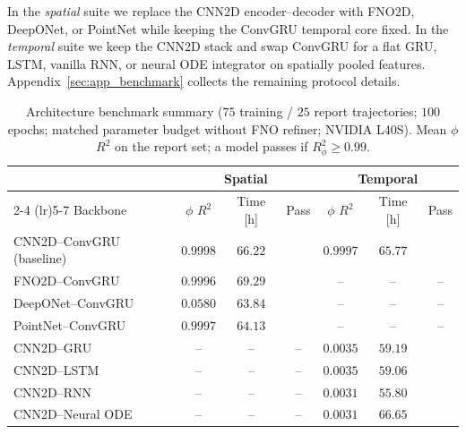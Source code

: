 \documentclass[10pt]{article}
\newcommand{\benchpass}{\textcolor{green!50!black}{\checkmark}}
\newcommand{\benchfail}{\textcolor{red}{\textbf{\texttimes}}}
\theoremstyle{definition}
\begin{document}
In the \emph{spatial} suite we replace the CNN2D encoder--decoder with FNO2D, DeepONet, or PointNet while keeping the ConvGRU temporal core fixed.
%
In the \emph{temporal} suite we keep the CNN2D stack and swap ConvGRU for a flat GRU, LSTM, vanilla RNN, or neural ODE integrator on spatially pooled features.
%
Appendix~\ref{sec:app_benchmark} collects the remaining protocol details.


\begin{table}[htbp]
\centering
\caption{Architecture benchmark summary ($75$ training / $25$ report trajectories; $100$ epochs; matched parameter budget without FNO refiner; NVIDIA L40S).
Mean $\phi$ $R^2$ on the report set; a model passes if $R^2_{\phi}\ge0.99$.}
\label{tab:benchmark_combined}
\begin{tabular}{lcccccc}
\toprule
 & \multicolumn{3}{c}{Spatial} & \multicolumn{3}{c}{Temporal} \\
\cmidrule(lr){2-4} \cmidrule(lr){5-7}
Backbone & $\phi$ $R^2$ & Time [h] & Pass & $\phi$ $R^2$ & Time [h] & Pass \\
\midrule
CNN2D--ConvGRU (baseline) & $0.9998$ & $66.22$ & \benchpass & $0.9997$ & $65.77$ & \benchpass \\
FNO2D--ConvGRU & $0.9996$ & $69.29$ & \benchpass & -- & -- & -- \\
DeepONet--ConvGRU & $0.0580$ & $63.84$ & \benchfail & -- & -- & -- \\
PointNet--ConvGRU & $0.9997$ & $64.13$ & \benchpass & -- & -- & -- \\
CNN2D--GRU & -- & -- & -- & $0.0035$ & $59.19$ & \benchfail \\
CNN2D--LSTM & -- & -- & -- & $0.0035$ & $59.06$ & \benchfail \\
CNN2D--RNN & -- & -- & -- & $0.0031$ & $55.80$ & \benchfail \\
CNN2D--Neural ODE & -- & -- & -- & $0.0031$ & $66.65$ & \benchfail \\
\bottomrule
\end{tabular}
\end{table}
\end{document}
